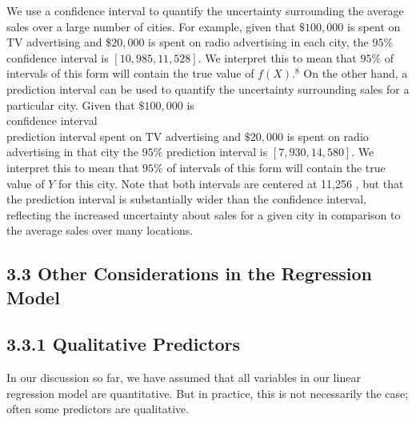\documentclass[10pt]{article}
\begin{document}
We use a confidence interval to quantify the uncertainty surrounding the average sales over a large number of cities. For example, given that $\$ 100,000$ is spent on TV advertising and $\$ 20,000$ is spent on radio advertising in each city, the $95 \%$ confidence interval is $[10,985,11,528]$. We interpret this to mean that $95 \%$ of intervals of this form will contain the true value of $f(X) .{ }^{8}$ On the other hand, a prediction interval can be used to quantify the uncertainty surrounding sales for a particular city. Given that $\$ 100,000$ is\\
confidence interval\\
prediction interval spent on TV advertising and $\$ 20,000$ is spent on radio advertising in that city the $95 \%$ prediction interval is $[7,930,14,580]$. We interpret this to mean that $95 \%$ of intervals of this form will contain the true value of $Y$ for this city. Note that both intervals are centered at 11,256 , but that the prediction interval is substantially wider than the confidence interval, reflecting the increased uncertainty about sales for a given city in comparison to the average sales over many locations.

\subsection*{3.3 Other Considerations in the Regression Model}
\subsection*{3.3.1 Qualitative Predictors}
In our discussion so far, we have assumed that all variables in our linear regression model are quantitative. But in practice, this is not necessarily the case; often some predictors are qualitative.
\end{document}
